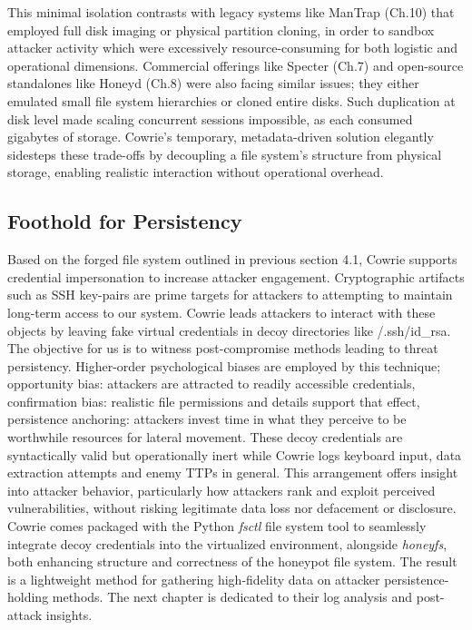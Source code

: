 \documentclass{cls/ULBreport}
\begin{document}
This minimal isolation contrasts with legacy systems like ManTrap (Ch.10) that employed full disk imaging or physical partition cloning, in order to sandbox attacker activity which were excessively resource-consuming for both logistic and operational dimensions. Commercial offerings like Specter (Ch.7) and open-source standalones like Honeyd (Ch.8) were also facing similar issues; they either emulated small file system hierarchies or cloned entire disks. Such duplication at disk level made scaling concurrent sessions impossible, as each consumed gigabytes of storage. Cowrie's temporary, metadata-driven solution elegantly sidesteps these trade-offs by decoupling a file system's structure from physical storage, enabling realistic interaction without operational overhead.


    \subsection{Foothold for Persistency}

Based on the forged file system outlined in previous section 4.1, Cowrie supports credential impersonation to increase attacker engagement. Cryptographic artifacts such as SSH key-pairs are prime targets for attackers to attempting to maintain long-term access to our system. Cowrie leads attackers to interact with these objects by leaving fake virtual credentials in decoy directories like \˜/.ssh/id\_rsa. The objective for us is to witness post-compromise methods leading to threat persistency. Higher-order psychological biases are employed by this technique; opportunity bias: attackers are attracted to readily accessible credentials, confirmation bias: realistic file permissions and details support that effect, persistence anchoring: attackers invest time in what they perceive to be worthwhile resources for lateral movement. These decoy credentials are syntactically valid but operationally inert while Cowrie logs keyboard input, data extraction attempts and enemy TTPs in general. This arrangement offers insight into attacker behavior, particularly how attackers rank and exploit perceived vulnerabilities, without risking legitimate data loss nor defacement or disclosure. Cowrie comes packaged with the Python \textit{fsctl} file system tool to seamlessly integrate decoy credentials into the virtualized environment, alongside \textit{honeyfs}, both enhancing structure and correctness of the honeypot file system. The result is a lightweight method for gathering high-fidelity data on attacker persistence-holding methods. The next chapter is dedicated to their log analysis and post-attack insights.
\end{document}
